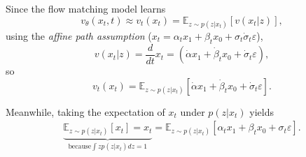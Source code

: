 Since the flow matching model learns
\begin{equation}
    v_{\theta}(x_t,t)\approx v_t(x_t) = \mathbb{E}_{z\sim p(z|x_t)}\left[
    v(x_t|z)
    \right],
\end{equation}
using the \emph{affine path assumption} ($x_t = \alpha_t x_1 + \beta_t x_0 + \sigma_t\dot\sigma_t\varepsilon$), 
\begin{equation}
    v(x_t|z) = \frac{d}{dt}x_t  = (\dot\alpha x_1 + \dot\beta_t x_0 + \dot\sigma_t\varepsilon),
\end{equation}
so
\begin{equation}\label{eq:appendix:x1_parameterization_v}
    v_t(x_t) = \mathbb{E}_{z\sim p(z|x_t)}\left[
    \dot\alpha x_1 + \dot\beta_t x_0 +\dot \sigma_t\varepsilon
    \right].
\end{equation}

Meanwhile, taking the expectation of $x_t$ under $p(z|x_t)$ yields
\begin{align}\label{eq:appendix:x1_parameterization_x}
    \underbrace{\mathbb{E}_{z\sim p(z|x_t)}[x_t] = x_t}_{\text{because} \int z p(z|x_t) dz = 1} = \mathbb{E}_{z\sim p(z|x_t)}[\alpha_t x_1 + \beta_t x_0 + \sigma_t\varepsilon].
\end{align}

